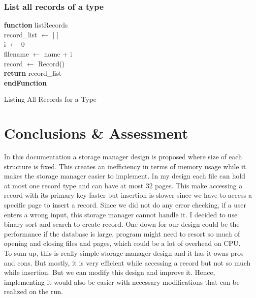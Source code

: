 \documentclass{article}
\newcounter{terms}
\begin{document}
        \subsubsection{List all records of a type}
             \begin{algorithm}[H]
\DontPrintSemicolon
\textbf{function} listRecords \\
record\_list $\leftarrow$ [ ] \\
i $\leftarrow$ 0 \\
filename $\leftarrow$ name + i \\
record $\leftarrow$ Record() \\

\textbf{return} record\_list \\
\textbf{endFunction}
\caption{Listing All Records for a Type}
\end{algorithm}
\newpage
\section{Conclusions \& Assessment}
    In this documentation a storage manager design is proposed where size of each
structure is fixed. This creates an inefficiency in terms of memory usage while
it makes the storage manager easier to implement.  In my design each file can hold at most one record type and can have at most 32 pages. This make accessing a record with its primary key faster but insertion is slower since we have to access a specific page to insert a record. Since we did not do any error checking, if a user enters a wrong input, this storage manager cannot handle it. I decided to use binary sort and search to create record. One down for our design could be the performance if the database is large, program might need to resort so much of opening and closing files and pages, which could be a lot of overhead on CPU.  \\
To sum up, this is really simple storage manager design and it has it owns pros and cons. But mostly, it is very efficient while accessing a record but not so much while insertion. But we can modify this design and improve it. Hence, implementing it would also be easier with necessary modifications that can be realized on the run.
\end{document}
